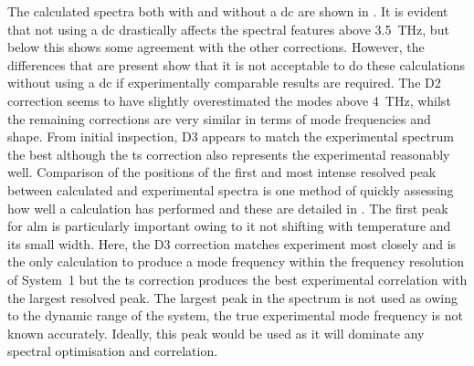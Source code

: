 The calculated spectra both with and without a \acrshort{dc} are shown in . It is evident that not using a \acrshort{dc} drastically affects the spectral features above \SI{3.5}{THz}, but below this shows some agreement with the other corrections. However, the differences that are present show that it is not acceptable to do these calculations without using a \acrshort{dc} if experimentally comparable results are required. The D2 correction seems to have slightly overestimated the modes above \SI{4}{THz}, whilst the remaining corrections are very similar in terms of mode frequencies and shape. From initial inspection, D3 appears to match the experimental spectrum the best although the \acrshort{ts} correction also represents the experimental reasonably well. Comparison of the positions of the first and most intense resolved peak between calculated and experimental spectra is one method of quickly assessing how well a calculation has performed and these are detailed in . The first peak for \acrshort{alm} is particularly important owing to it not shifting with temperature and its small width. Here, the D3 correction matches experiment most closely and is the only calculation to produce a mode frequency within the frequency resolution of System~1 but the \acrshort{ts} correction produces the best experimental correlation with the largest resolved peak. The largest peak in the spectrum is not used as owing to the dynamic range of the system, the true experimental mode frequency is not known accurately. Ideally, this peak would be used as it will dominate any spectral optimisation and correlation.

